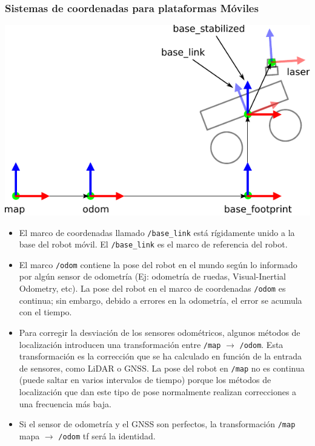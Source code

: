 \begin{frame}[fragile]
    \frametitle{Sistemas de coordenadas para plataformas Móviles}
    \scriptsize
    \begin{center}
        \includegraphics[width=0.3\columnwidth]{images/ros_coordinate_systems.pdf}
    \end{center}
    
    \begin{itemize}
        \item El marco de coordenadas llamado \lstinline[style=bash]{/base_link} está rígidamente unido a la base del robot móvil. El \lstinline[style=bash]{/base_link} es el marco de referencia del robot.
        
        \item El marco \lstinline[style=bash]{/odom} contiene la pose del robot en el mundo según lo informado por algún sensor de odometría (Ej: odometría de ruedas, Visual-Inertial Odometry, etc). La pose del robot en el marco de coordenadas \lstinline[style=bash]{/odom} es continua; sin embargo, debido a errores en la odometría, el error se acumula con el tiempo.
        
        \item Para corregir la desviación de los sensores odométricos, algunos métodos de localización introducen una transformación entre \lstinline[style=bash]{/map} $\rightarrow$ \lstinline[style=bash]{/odom}. Esta transformación es la corrección que se ha calculado en función de la entrada de sensores, como LiDAR o GNSS. La pose del robot en \lstinline[style=bash]{/map} no es continua (puede saltar en varios intervalos de tiempo) porque los métodos de localización que dan este tipo de pose normalmente realizan correcciones a una frecuencia más baja.
        
        \item Si el sensor de odometría y el GNSS son perfectos, la transformación \lstinline[style=bash]{/map} mapa $\rightarrow$ \lstinline[style=bash]{/odom} tf será la identidad.
        
        
    \end{itemize}
    
\end{frame}



